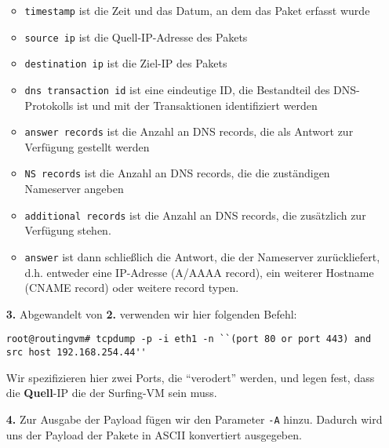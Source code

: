 \documentclass[10pt,a4paper]{article}
\begin{document}
\begin{enumerate}
                      \begin{itemize}
                          \item \texttt{timestamp} ist die Zeit und das Datum, an dem das Paket
                                erfasst wurde
                          \item \texttt{source ip} ist die Quell-IP-Adresse des Pakets
                          \item \texttt{destination ip} ist die Ziel-IP des Pakets
                          \item \texttt{dns transaction id} ist eine eindeutige ID,
                                die Bestandteil des DNS-Protokolls ist und mit der
                                Transaktionen identifiziert werden
                          \item \texttt{answer records} ist die Anzahl an DNS records,
                                die als Antwort zur Verfügung gestellt werden
                          \item \texttt{NS records} ist die Anzahl an DNS records,
                                die die zuständigen Nameserver angeben
                          \item \texttt{additional records} ist die Anzahl an DNS records,
                                die zusätzlich zur Verfügung stehen.
                          \item \texttt{answer} ist dann schließlich die Antwort, die der
                                Nameserver zurückliefert, d.h. entweder eine IP-Adresse
                                (A/AAAA record), ein weiterer Hostname (CNAME record)
                                oder weitere record typen.
                      \end{itemize}

        \item[\bf 3.] Abgewandelt von \textbf{2.} verwenden wir hier folgenden Befehl:
                      \begin{lstlisting}[style=BashInputStyle]
root@routingvm# tcpdump -p -i eth1 -n ``(port 80 or port 443) and src host 192.168.254.44''
                      \end{lstlisting}

                      Wir spezifizieren hier zwei Ports, die ``verodert'' werden,
                      und legen fest, dass die \textbf{Quell}-IP die der Surfing-VM
                      sein muss.

        \item[\bf 4.] Zur Ausgabe der Payload fügen wir den Parameter \texttt{-A}
                      hinzu. Dadurch wird uns der Payload der Pakete in ASCII
                      konvertiert ausgegeben.


\end{enumerate}
\end{document}
